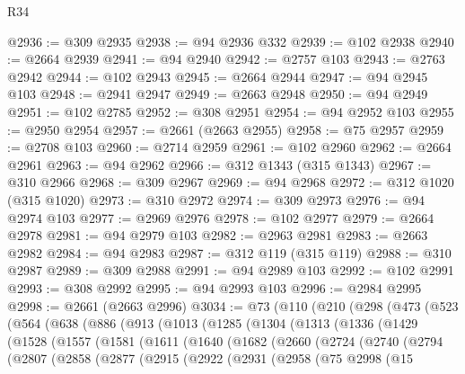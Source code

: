 \begin{lexlean}{R34}
\begin{coremodule}
@2936 := @309 @2935
@2938 := @94 @2936 @332
@2939 := @102 @2938
@2940 := @2664 @2939
@2941 := @94 @2940
@2942 := @2757 @103
@2943 := @2763 @2942
@2944 := @102 @2943
@2945 := @2664 @2944
@2947 := @94 @2945 @103
@2948 := @2941 @2947
@2949 := @2663 @2948
@2950 := @94 @2949
@2951 := @102 @2785
@2952 := @308 @2951
@2954 := @94 @2952 @103
@2955 := @2950 @2954
@2957 := @2661 (@2663 @2955)
@2958 := @75 @2957
@2959 := @2708 @103
@2960 := @2714 @2959
@2961 := @102 @2960
@2962 := @2664 @2961
@2963 := @94 @2962
@2966 := @312 @1343 (@315 @1343)
@2967 := @310 @2966
@2968 := @309 @2967
@2969 := @94 @2968
@2972 := @312 @1020 (@315 @1020)
@2973 := @310 @2972
@2974 := @309 @2973
@2976 := @94 @2974 @103
@2977 := @2969 @2976
@2978 := @102 @2977
@2979 := @2664 @2978
@2981 := @94 @2979 @103
@2982 := @2963 @2981
@2983 := @2663 @2982
@2984 := @94 @2983
@2987 := @312 @119 (@315 @119)
@2988 := @310 @2987
@2989 := @309 @2988
@2991 := @94 @2989 @103
@2992 := @102 @2991
@2993 := @308 @2992
@2995 := @94 @2993 @103
@2996 := @2984 @2995
@2998 := @2661 (@2663 @2996)
@3034 := @73
    (@110
      (@210
        (@298
          (@473
            (@523
              (@564
                (@638
                  (@886
                    (@913
                      (@1013
                        (@1285
                          (@1304
                            (@1313
                              (@1336
                                (@1429
                                  (@1528
                                    (@1557
                                      (@1581
                                        (@1611
                                          (@1640
                                            (@1682
                                              (@2660
                                                (@2724
                                                  (@2740
                                                    (@2794
                                                      (@2807
                                                        (@2858
                                                          (@2877
                                                            (@2915
                                                              (@2922
                                                                (@2931
                                                                  (@2958
                                                                    (@75
                                                                      @2998
                                                                      (@15

\end{coremodule}
\end{lexlean}
